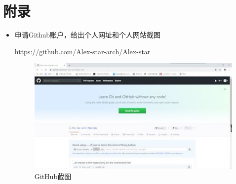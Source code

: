 \documentclass{article}
\begin{document}
\section{附录}
\begin{itemize}
    \item 申请Github账户，给出个人网址和个人网站截图\par 
    https://github.com/Alex-star-arch/Alex-star\par 
    \begin{figure}[H]
    	\centering
    	\includegraphics[scale=0.6]{GitHub}
    	\caption{GitHub截图}\par
    	\label{fig:深度学习}
    \end{figure}
    

\end{itemize}
\end{document}
